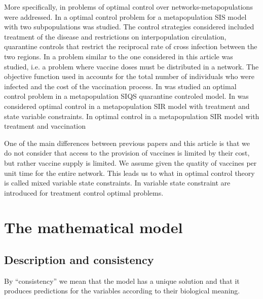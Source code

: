 \documentclass[a4paper,10pt]{article}
\theoremstyle{remark}
\begin{document}
More specifically, in \cite{rowthorn2009optimal,asano2008optimal, mbah2011resource,Chen-2014,Chen-2014b}  problems of optimal control over networks-metapopulations were addressed.
In \cite{rowthorn2009optimal} a optimal control problem for a metapopulation SIS model with two subpopulations was studied.  The control strategies considered included treatment of the disease and restrictions on interpopulation circulation, quarantine controls that
restrict the reciprocal rate of cross infection between
the two regions. In \cite{asano2008optimal} a problem similar to the one considered in this article was studied, i.e. a problem  where vaccine doses must be distributed in a network. The objective function used in \cite{asano2008optimal} accounts for the total number of individuals who were infected and the cost of the vaccination process.  In \cite{Li-2019} was studied an optimal control problem in a metapopulation  SIQS quarantine controled  model. In \cite{mbah2011resource} was considered optimal control in a metapopulation  SIR model with   treatment and state variable constraints. 
In \cite{Chen-2014,Chen-2014b} optimal control in a metapopulation  SIR model with   treatment and vaccination
 
 One of the main differences between previous papers  and this article is that we do not consider that access to the provision of vaccines is  limited by their cost, but rather vaccine supply is limited. We assume given the quatity of vaccines per unit time   for the entire network. This leads us to what in optimal control theory is called mixed variable state constraints. In \cite{mbah2011resource, rowthorn2009optimal} variable state constraint are introduced for  treatment control optimal problems.  

 

 
\section{The mathematical model}

\subsection{Description and consistency}
By ``consistency'' we mean that the model has a unique solution and  that it produces predictions  for the variables according to their biological meaning.
\end{document}
